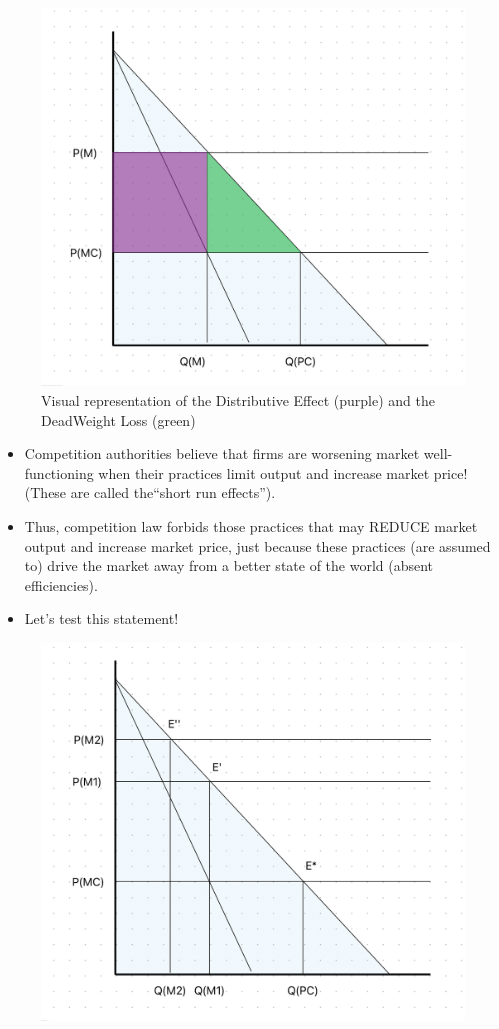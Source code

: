     \begin{figure}[h]
        \centering
        \includegraphics[width=0.68\linewidth]{graphics/L3-3_DistributiveEffect_DWL.png}
        \caption{Visual representation of the Distributive Effect (purple) and the DeadWeight Loss (green)}
        \label{fig:DistribEffect_DWL}
    \end{figure}

    \begin{itemize}
        \item Competition authorities believe that firms are worsening market well-functioning when their practices limit output and increase market price! (These are called the“short run effects”). 
        \item Thus, competition law forbids those practices that may REDUCE market output and increase market price, just because these practices (are assumed to) drive the market away from a better state of the world (absent efficiencies).
        \item Let’s test this statement!
    \end{itemize}

    \begin{figure}[h]
        \centering
        \includegraphics[width=0.80\linewidth]{graphics/L3-4_DifferentMonopolies2.png}
        \label{fig:different_monopolies}
    \end{figure}

